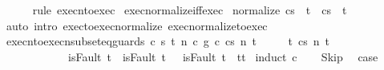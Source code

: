 \begin{isabellebody}
\ \ \ \ \isamarkupfalse%
\ {\isacharparenleft}rule\ execn{\isacharunderscore}to{\isacharunderscore}exec{\isacharparenright}\isanewline
{}\isamarkupfalse%
%
\endisatagproof
{\isafoldproof}%
%
\isadelimproof
\isanewline
%
\endisadelimproof
\isanewline
{}\isamarkupfalse%
\ exec{\isacharunderscore}normalize{\isacharunderscore}iff{\isacharunderscore}exec{\isacharcolon}\isanewline
\ {\isachardoublequoteopen}{\isasymGamma}{\isasymturnstile}{\isasymlangle}normalize\ c{\isacharcomma}s{\isasymrangle}\ {\isasymRightarrow}\ t\ {\isacharequal}\ {\isasymGamma}{\isasymturnstile}{\isasymlangle}c{\isacharcomma}s{\isasymrangle}\ {\isasymRightarrow}\ t{\isachardoublequoteclose}\ \isanewline
%
\isadelimproof
\ \ %
\endisadelimproof
%
\isatagproof
{}\isamarkupfalse%
\ {\isacharparenleft}auto\ intro{\isacharcolon}\ exec{\isacharunderscore}to{\isacharunderscore}exec{\isacharunderscore}normalize\ exec{\isacharunderscore}normalize{\isacharunderscore}to{\isacharunderscore}exec{\isacharparenright}%
\endisatagproof
{\isafoldproof}%
%
\isadelimproof
%
\endisadelimproof
%
\isamarkuptrue%
\isamarkupfalse%
\ execn{\isacharunderscore}to{\isacharunderscore}execn{\isacharunderscore}subseteq{\isacharunderscore}guards{\isacharcolon}\ {\isachardoublequoteopen}{\isasymAnd}c\ s\ t\ n{\isachardot}\ {\isasymlbrakk}c\ {\isasymsubseteq}\isactrlsub g\ c{\isacharprime}{\isacharsemicolon}\ {\isasymGamma}{\isasymturnstile}{\isasymlangle}c{\isacharcomma}s{\isasymrangle}\ {\isacharequal}n{\isasymRightarrow}\ t{\isasymrbrakk}\isanewline
\ \ \ \ {\isasymLongrightarrow}\ {\isasymexists}t{\isacharprime}{\isachardot}\ {\isasymGamma}{\isasymturnstile}{\isasymlangle}c{\isacharprime}{\isacharcomma}s{\isasymrangle}\ {\isacharequal}n{\isasymRightarrow}\ t{\isacharprime}\ {\isasymand}\ \isanewline
\ \ \ \ \ \ \ \ \ \ \ \ {\isacharparenleft}isFault\ t\ {\isasymlongrightarrow}\ isFault\ t{\isacharprime}{\isacharparenright}\ {\isasymand}\ {\isacharparenleft}{\isasymnot}\ isFault\ t{\isacharprime}\ {\isasymlongrightarrow}\ t{\isacharprime}{\isacharequal}t{\isacharparenright}{\isachardoublequoteclose}\isanewline
%
\isadelimproof
%
\endisadelimproof
%
\isatagproof
{}\isamarkupfalse%
\ {\isacharparenleft}induct\ c{\isacharprime}{\isacharparenright}\isanewline
\ \ \isamarkupfalse%
\ Skip\ \isamarkupfalse%
\ {\isacharquery}case\ \isanewline
\ \ \ \ \isamarkupfalse%

\end{isabellebody}

